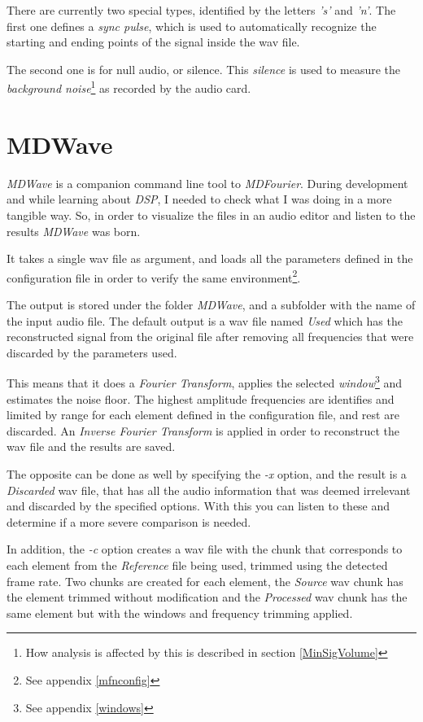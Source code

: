 \documentclass[10pt,a4paper]{report}
\begin{document}
\begin{appendices}
There are currently two special types, identified by the letters \textit{'s'} and \textit{'n'}. The first one defines a \textit{sync pulse}, which is used to automatically recognize the starting and ending points of the signal inside the \acrshort{wav} file. 

The second one is for null audio, or silence. This \textit{silence} is used to measure the \textit{background noise}\footnote{How analysis is affected by this is described in section \ref{MinSigVolume}} as recorded by the audio card. 	

\chapter{MDWave}
\label{mdwave}

\textit{MDWave} is a companion command line tool to \textit{MDFourier}. During development and while learning about \textit{DSP}, I needed to check what I was doing in a more tangible way. So, in order to visualize the files in an audio editor and listen to the results \textit{MDWave} was born.

It takes a single \acrshort{wav} file as argument, and loads all the parameters defined in the configuration file in order to verify the same environment\footnote{See appendix \ref{mfnconfig}}.

The output is stored under the folder \textit{MDWave}, and a subfolder with the name of the input audio file. The default output is a \acrshort{wav} file named \textit{Used} which has the reconstructed signal from the original file after removing all frequencies that were discarded by the parameters used.

This means that it does a \textit{Fourier Transform}, applies the selected \textit{window}\footnote{See appendix \ref{windows}} and estimates the noise floor. The highest amplitude frequencies are identifies and limited by range for each element defined in the configuration file, and rest are discarded. An \textit{Inverse Fourier Transform} is applied in order to reconstruct the \acrshort{wav} file and the results are saved.

The opposite can be done as well by specifying the \textit{-x} option, and the result is a \textit{Discarded} \acrshort{wav} file, that has all the audio information that was deemed irrelevant and discarded by the specified options. With this you can listen to these and determine if a more severe comparison is needed.

In addition, the \textit{-c} option creates a \acrshort{wav} file with the chunk that corresponds to each element from the \textit{Reference} file being used, trimmed using the detected frame rate. Two chunks are created for each element, the \textit{Source} \acrshort{wav} chunk has the element trimmed without modification and the \textit{Processed} \acrshort{wav} chunk has the same element but with the windows and frequency trimming applied.


\end{appendices}
\end{document}
